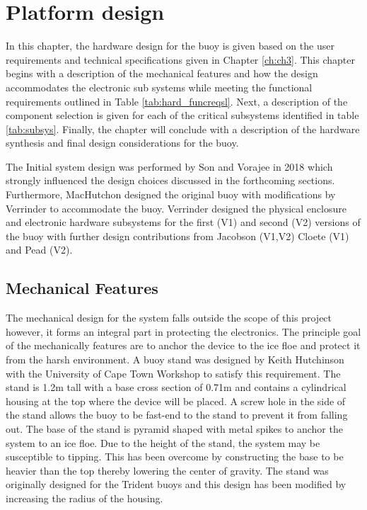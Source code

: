 
\chapter{Platform design}
\label{sec:ch3_platform}

In this chapter, the hardware design for the buoy is given based on the user requirements and technical specifications given in Chapter \ref{ch:ch3}. This chapter begins with a description of the mechanical features and how the design accommodates the electronic sub systems while meeting the functional requirements outlined in Table \ref{tab:hard_funcreqsl}. Next, a description of the component selection is given for each of the critical subsystems identified in table \ref{tab:subsys}. Finally, the chapter will conclude with a description of the hardware synthesis and final design considerations for the buoy. \par 

The Initial system design was performed by Son and Vorajee in 2018 which strongly influenced the design choices discussed in the forthcoming sections. Furthermore, MacHutchon designed the original buoy with modifications by Verrinder to accommodate the buoy. Verrinder designed the physical enclosure and electronic hardware subsystems for the first (V1) and second (V2) versions of the buoy with further design contributions from Jacobson (V1,V2) Cloete (V1) and Pead (V2).
\section{Mechanical Features}

The mechanical design for the system falls outside the scope of this project however, it forms an integral part in protecting the electronics. The principle goal of the mechanically features are to anchor the device to the ice floe and protect it from the harsh environment. A buoy stand was designed by Keith Hutchinson with the University of Cape Town Workshop to satisfy this requirement. The stand is 1.2m tall with a base cross section of 0.71m and contains a cylindrical housing at the top where the device will be placed. A screw hole in the side of the stand allows the buoy to be fast-end to the stand to prevent it from falling out. The base of the stand is pyramid shaped with metal spikes to anchor the system to an ice floe. Due to the height of the stand, the system may be susceptible to tipping. This has been overcome by constructing the base to be heavier than the top thereby lowering the center of gravity. The stand was originally designed for the Trident buoys and this design has been modified by increasing the radius of the housing. 

